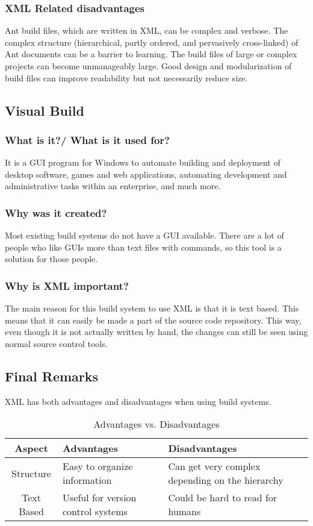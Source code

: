 \subsubsection{XML Related disadvantages}

Ant build files, which are written in XML, can be complex and verbose. The complex structure (hierarchical, partly ordered, and pervasively cross-linked) of Ant documents can be a barrier to learning. The build files of large or complex projects can become unmanageably large. Good design and modularization of build files can improve readability but not necessarily reduce size.

\subsection{Visual Build}
\subsubsection{What is it?/ What is it used for?}

It is a GUI program for Windows to automate building and deployment of desktop software, games and web applications, automating development and administrative tasks within an enterprise, and much more. 
\subsubsection{Why was it created?}
Most existing build systems do not have a GUI available. There are a lot of people who like GUIs more than text files with commands, so this tool is a solution for those people. 
\subsubsection{Why is XML important?}
The main reason for this build system to use XML is that it is text based. This means that it can easily be made a part of the source code repository. This way, even though it is not actually written by hand, the changes can still be seen using normal source control tools. 

\subsection{Final Remarks}

XML has both advantages and disadvantages when using build systems.

\begin{table}
    \begin{tabulary}{\textwidth}{cLL}
        \toprule
       Aspect &  Advantages & Disadvantages \\
        \midrule
    Structure & Easy to organize information & Can get very complex depending on the hierarchy \\
        \midrule
    Text Based & Useful for version control systems & Could be hard to read for humans \\
    \bottomrule
    \end{tabulary}
    \caption{Advantages vs. Disadvantages}
\end{table}

